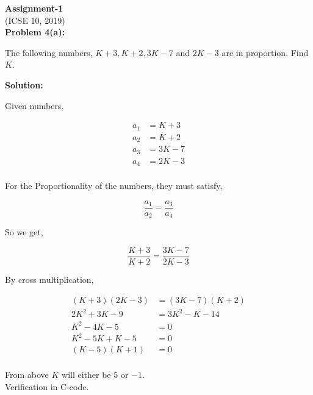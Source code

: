 \documentclass[11pt]{article}
\begin{document}
\begin{center}
    \LARGE{\textbf{Assignment-1}\\(ICSE 10, 2019)}\\[2\baselineskip]
    \textbf{\large Problem 4(a):}
\end{center}
\begin{flushleft}
The following numbers, $K + 3, K + 2, 3K - 7$ and $2K - 3$ are in proportion. Find $K$.\\[2\baselineskip]
\end{flushleft}
\begin{center}
    \textbf{\large Solution:}
\end{center}

\noindent Given numbers,

\begin{align*}
a_1 & = K + 3\\
a_2 & = K + 2\\
a_3 & = 3K - 7\\
a_4 & = 2K - 3\\
\end{align*}

\noindent For the Proportionality of the numbers, they must satisfy,

\[ \frac{a_1}{a_2} = \frac{a_3}{a_4} \]

\noindent So we get,

\[ \frac{K + 3}{K + 2} = \frac{3K - 7}{2K - 3} \]

\noindent By cross multiplication,

\begin{align*}
    (K + 3)(2K - 3) & = (3K - 7)(K + 2)\\
    2K^2 + 3K - 9 & = 3K^2 - K - 14\\
    K^2 - 4K - 5 & = 0\\
    K^2 - 5K + K - 5 & = 0\\
    (K - 5)(K + 1) & = 0\\
\end{align*}

\noindent From above $K$ will either be $5$ or $-1$.\\ [\baselineskip] Verification in C-code.
\end{document}
